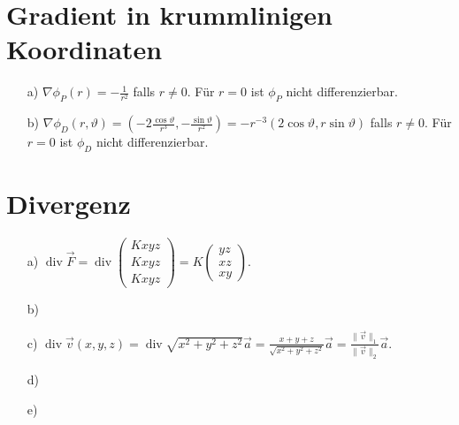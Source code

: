 \documentclass[11pt]{article}
\theoremstyle{plain}
\theoremstyle{definition}
\theoremstyle{remark}
\newcommand{\D}{\displaystyle}
\begin{document}
\section{Gradient in krummlinigen Koordinaten}

\begin{itemize}
\item[a)] 
$ \D \nabla \phi_P (r) = -\frac{1}{r^2} $ falls $ r \neq 0 $. Für $ r=0 $ ist $ \phi_P $ nicht differenzierbar. 

\item[b)] 
$ \D \nabla \phi_D (r,\vartheta) = \left( -2 \frac{\cos \vartheta}{r^3} , - \frac{\sin \vartheta}{r^2} \right) = -r^{-3} (2\cos \vartheta,r\sin\vartheta) $ falls $ r \neq 0 $. Für $ r=0 $ ist $ \phi_D $ nicht differenzierbar. 
\end{itemize}


\section{Divergenz}

\begin{itemize}
\item[a)] 
$ \operatorname{div} \vec{F} 
= \operatorname{div} 
	\begin{pmatrix} Kxyz \\ Kxyz \\ Kxyz \end{pmatrix} 
= K \begin{pmatrix} yz \\ xz \\ xy \end{pmatrix}. $ 

\item[b)] 

\item[c)] 
$ \operatorname{div} \vec{v} (x,y,z) 
= \operatorname{div} \sqrt{x^2+y^2+z^2} \vec{a} 
= \frac{x+y+z}{\sqrt{x^2+y^2+z^2}} \vec{a} 
= \frac{\| \vec{v} \|_1}{\| \vec{v} \|_2} \vec{a}. $ 

\item[d)] 

\item[e)]  

\end{itemize}
\end{document}
